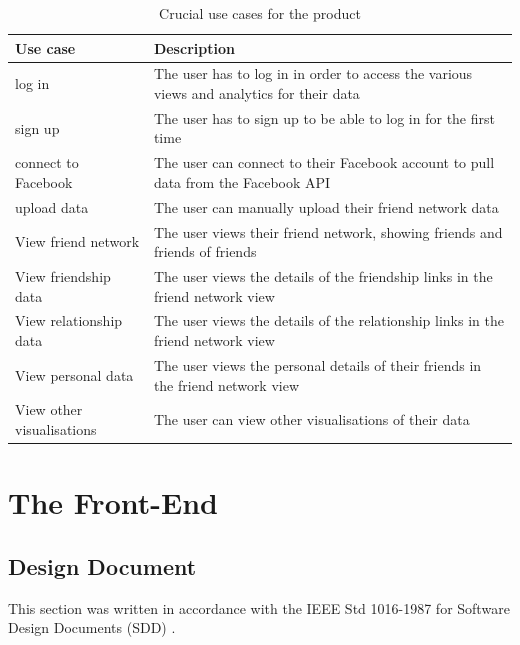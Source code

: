 \documentclass[12pt,onecolumn]{article}
\begin{document}
	\begin{table} [htbp]
		\caption{Crucial use cases for the product}
		\label{usecase}
		\centering
		\begin{tabular}{p{}|p{}}
		\hline
		\textbf{Use case} & \textbf{Description} \\ \hline
		log in & The user has to log in in order to access the various views and analytics for their data \\
		sign up & The user has to sign up to be able to log in for the first time \\
		connect to Facebook & The user can connect to their Facebook account to pull data from the Facebook API \\
		upload data & The user can manually upload their friend network data \\
		View friend network & The user views their friend network, showing friends and friends of friends \\
		View friendship data & The user views the details of the friendship links in the friend network view \\
		View relationship data & The user views the details of the relationship links in the friend network view \\
		View personal data & The user views the personal details of their friends in the friend network view \\
		View other visualisations & The user can view other visualisations of their data \\ \hline
		\end{tabular}
	\end{table}

	

\section{The Front-End}	

	\subsection{Design Document} %
	This section was written in accordance with the IEEE Std 1016-1987 for Software Design Documents (SDD) \cite{IEEE}. 
	
\end{document}
